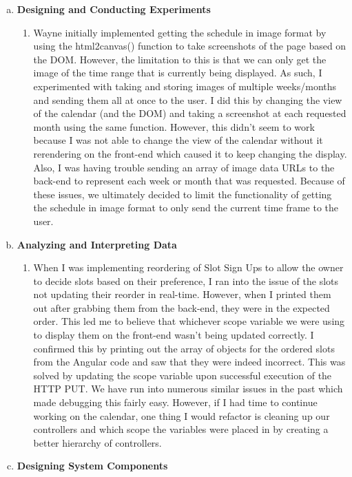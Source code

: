 \documentclass[11pt]{article}   %
\begin{document}
\begin{enumerate} [a)]
\item  {\bf Designing and Conducting Experiments}
\begin{enumerate} [$\cdot$]
\item Wayne initially implemented getting the schedule in image format by using the html2canvas() function to take screenshots of the page based on the DOM. However, the limitation to this is that we can only get the image of the time range that is currently being displayed. As such, I experimented with taking and storing images of multiple weeks/months and sending them all at once to the user. I did this by changing the view of the calendar (and the DOM) and taking a screenshot at each requested month using the same function. However, this didn't seem to work because I was not able to change the view of the calendar without it rerendering on the front-end which caused it to keep changing the display. Also, I was having trouble sending an array of image data URLs to the back-end to represent each week or month that was requested. Because of these issues, we ultimately decided to limit the functionality of getting the schedule in image format to only send the current time frame to the user.
\end{enumerate}
\item  {\bf Analyzing and Interpreting Data}
\begin{enumerate} [$\cdot$]
\item When I was implementing reordering of Slot Sign Ups to allow the owner to decide slots based on their preference, I ran into the issue of the slots not updating their reorder in real-time. However, when I printed them out after grabbing them from the back-end, they were in the expected order. This led me to believe that whichever scope variable we were using to display them on the front-end wasn't being updated correctly. I confirmed this by printing out the array of objects for the ordered slots from the Angular code and saw that they were indeed incorrect. This was solved by updating the scope variable upon successful execution of the HTTP PUT. We have run into numerous similar issues in the past which made debugging this fairly easy. However, if I had time to continue working on the calendar, one thing I would refactor is cleaning up our controllers and which scope the variables were placed in by creating a better hierarchy of controllers.
\end{enumerate}
\item {\bf Designing System Components}

\end{enumerate}
\end{document}
